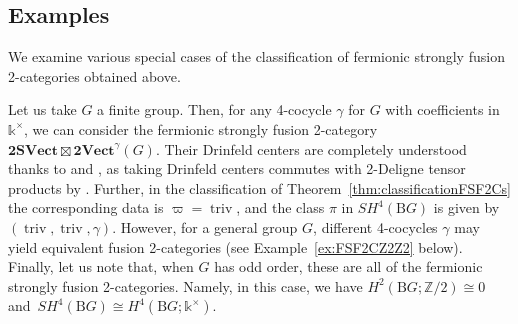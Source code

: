 \documentclass[10pt,a4paper]{amsart}
\numberwithin{equation}{section}
\begin{document}
\subsection{Examples}

We examine various special cases of the classification of fermionic strongly fusion 2-categories obtained above.

\begin{Example}\label{ex:topcocycleonly}
Let us take $G$ a finite group. Then, for any 4-cocycle $\gamma$ for $G$ with coefficients in $\mathds{k}^{\times}$, we can consider the fermionic strongly fusion 2-category $\mathbf{2SVect}\boxtimes \mathbf{2Vect}^{\gamma}(G)$. Their Drinfeld centers are completely understood thanks to \cite{KTZ} and \cite{JF2}, as taking Drinfeld centers commutes with 2-Deligne tensor products by \cite{D9}. Further, in the classification of Theorem~\ref{thm:classificationFSF2Cs} the corresponding data is $\varpi = \operatorname{triv}$, and the class $\pi$ in $SH^4(\mathrm{B}G)$ is given by $(\operatorname{triv}, \operatorname{triv}, \gamma)$. However, for a general group $G$, different 4-cocycles $\gamma$ may yield equivalent fusion 2-categories (see Example~\ref{ex:FSF2CZ2Z2} below). Finally, let us note that, when $G$ has odd order, these are all of the fermionic strongly fusion 2-categories. Namely, in this case, we have $H^2(\mathrm{B}G;\mathbb{Z}/2)\cong 0$ and~$SH^{4}(\mathrm{B}G)\cong H^4(\mathrm{B}G;\mathds{k}^{\times})$.
\end{Example}
\end{document}

